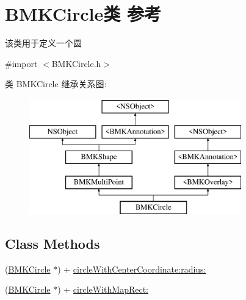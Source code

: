 \hypertarget{interface_b_m_k_circle}{\section{B\+M\+K\+Circle类 参考}
\label{interface_b_m_k_circle}
}


该类用于定义一个圆  




{\ttfamily \#import $<$B\+M\+K\+Circle.\+h$>$}

类 B\+M\+K\+Circle 继承关系图\+:\begin{figure}[H]
\begin{center}
\leavevmode
\includegraphics[height=5.000000cm]{interface_b_m_k_circle}
\end{center}
\end{figure}
\subsection*{Class Methods}
\begin{DoxyCompactItemize}
\item 
(\hyperlink{interface_b_m_k_circle}{B\+M\+K\+Circle} $\ast$) + \hyperlink{interface_b_m_k_circle_a82a7234e92fda719b74d6055ee30d360}{circle\+With\+Center\+Coordinate\+:radius\+:}
\item 
(\hyperlink{interface_b_m_k_circle}{B\+M\+K\+Circle} $\ast$) + \hyperlink{interface_b_m_k_circle_af4109f36f784b80a758a0b48c636e4a7}{circle\+With\+Map\+Rect\+:}
\end{DoxyCompactItemize}
